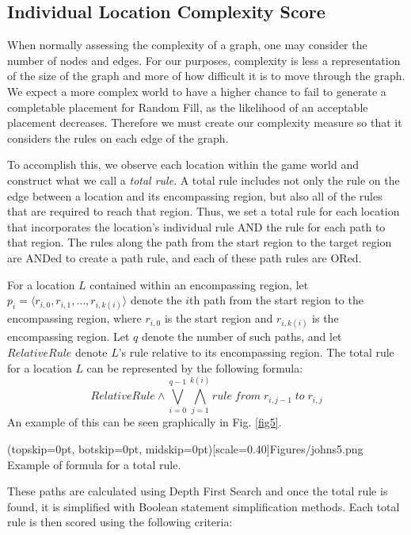 \documentclass{ieeeaccess}
\begin{document}
\subsection{Individual Location Complexity Score}
When normally assessing the complexity of a graph, one may consider the number of nodes and
edges. For our purposes, complexity is less a representation of the size of the graph and more
of how difficult it is to move through the graph. We expect a more complex world to have a
higher chance to fail to generate a completable placement for Random Fill, as the likelihood
of an acceptable placement decreases. Therefore we must create our complexity measure so that
it considers the rules on each edge of the graph.

To accomplish this, we observe each location within the game world and construct what we call a
\textit{total rule}. A total rule includes not only the rule on the edge between a location and
its encompassing region, but also all of the rules that are required to reach that region.
Thus, we set a total rule for each location that incorporates the location's individual rule
AND the rule for each path to that region. The rules along the path from the start region to
the target region are ANDed to create a path rule, and each of these path rules are ORed. 

For a location $L$ contained within an encompassing region,
let $p_i = \langle r_{i,0}, r_{i,1}, \ldots, r_{i,k(i)} \rangle$
denote the $i$th path from the start region to the
encompassing region, where $r_{i,0}$ is the start region and
$r_{i,k(i)}$ is the encompassing region.
Let $q$ denote the number of such paths, and let $RelativeRule$
denote $L$'s rule relative to its encompassing region.
The total rule for a location $L$ can be represented by the following formula:
\begin{equation}
RelativeRule \wedge \bigvee_{i=0}^{q-1}
\bigwedge_{j=1}^{k(i)}rule\;from\;r_{i,j-1}\;to\;r_{i,j}
\label{eq_total_rule}
\end{equation}
An example of this can be seen graphically in Fig. \ref{fig5}.

\Figure[t!](topskip=0pt, botskip=0pt, midskip=0pt)[scale=0.40]{Figures/johns5.png}
{Example of formula for a total rule.\label{fig5}}

These paths are calculated using Depth First Search and once the total rule is found, it is
simplified with Boolean statement simplification methods. Each total rule is then scored using
the following criteria:
\end{document}
